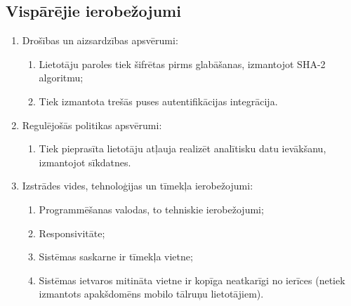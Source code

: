 \subsection{Vispārējie ierobežojumi}

\begin{enumerate}
	\item Drošības un aizsardzības apsvērumi:
	      \begin{enumerate}
		      \item Lietotāju paroles tiek šifrētas pirms glabāšanas, izmantojot SHA-2 algoritmu;
		      \item Tiek izmantota trešās puses autentifikācijas integrācija.
	      \end{enumerate}
	\item Regulējošās politikas apsvērumi:
	      \begin{enumerate}
		      \item Tiek pieprasīta lietotāju atļauja realizēt analītisku datu ievākšanu, izmantojot sīkdatnes.
	      \end{enumerate}
	\item Izstrādes vides, tehnoloģijas un tīmekļa ierobežojumi:
	      \begin{enumerate}
		      \item Programmēšanas valodas, to tehniskie ierobežojumi;
		      \item Responsivitāte;
		      \item Sistēmas saskarne ir tīmekļa vietne;
		      \item Sistēmas ietvaros mitināta vietne ir kopīga neatkarīgi no ierīces (netiek izmantots apakšdomēns mobilo tālruņu lietotājiem).
	      \end{enumerate}
\end{enumerate}
